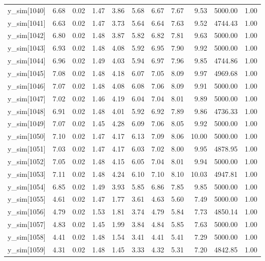 \begin{table}[ht]
\begin{tabular}{rrrrrrrrrrr}
  y\_sim[1040] & 6.68 & 0.02 & 1.47 & 3.86 & 5.68 & 6.67 & 7.67 & 9.53 & 5000.00 & 1.00 \\ 
  y\_sim[1041] & 6.63 & 0.02 & 1.47 & 3.73 & 5.64 & 6.64 & 7.63 & 9.52 & 4744.43 & 1.00 \\ 
  y\_sim[1042] & 6.80 & 0.02 & 1.48 & 3.87 & 5.82 & 6.82 & 7.81 & 9.63 & 5000.00 & 1.00 \\ 
  y\_sim[1043] & 6.93 & 0.02 & 1.48 & 4.08 & 5.92 & 6.95 & 7.90 & 9.92 & 5000.00 & 1.00 \\ 
  y\_sim[1044] & 6.96 & 0.02 & 1.49 & 4.03 & 5.94 & 6.97 & 7.96 & 9.85 & 4744.86 & 1.00 \\ 
  y\_sim[1045] & 7.08 & 0.02 & 1.48 & 4.18 & 6.07 & 7.05 & 8.09 & 9.97 & 4969.68 & 1.00 \\ 
  y\_sim[1046] & 7.07 & 0.02 & 1.48 & 4.08 & 6.08 & 7.06 & 8.09 & 9.91 & 5000.00 & 1.00 \\ 
  y\_sim[1047] & 7.02 & 0.02 & 1.46 & 4.19 & 6.04 & 7.04 & 8.01 & 9.89 & 5000.00 & 1.00 \\ 
  y\_sim[1048] & 6.91 & 0.02 & 1.48 & 4.01 & 5.92 & 6.92 & 7.89 & 9.86 & 4736.33 & 1.00 \\ 
  y\_sim[1049] & 7.07 & 0.02 & 1.45 & 4.28 & 6.09 & 7.06 & 8.05 & 9.92 & 5000.00 & 1.00 \\ 
  y\_sim[1050] & 7.10 & 0.02 & 1.47 & 4.17 & 6.13 & 7.09 & 8.06 & 10.00 & 5000.00 & 1.00 \\ 
  y\_sim[1051] & 7.03 & 0.02 & 1.47 & 4.17 & 6.03 & 7.02 & 8.00 & 9.95 & 4878.95 & 1.00 \\ 
  y\_sim[1052] & 7.05 & 0.02 & 1.48 & 4.15 & 6.05 & 7.04 & 8.01 & 9.94 & 5000.00 & 1.00 \\ 
  y\_sim[1053] & 7.11 & 0.02 & 1.48 & 4.24 & 6.10 & 7.10 & 8.10 & 10.03 & 4947.81 & 1.00 \\ 
  y\_sim[1054] & 6.85 & 0.02 & 1.49 & 3.93 & 5.85 & 6.86 & 7.85 & 9.85 & 5000.00 & 1.00 \\ 
  y\_sim[1055] & 4.61 & 0.02 & 1.47 & 1.77 & 3.61 & 4.63 & 5.60 & 7.49 & 5000.00 & 1.00 \\ 
  y\_sim[1056] & 4.79 & 0.02 & 1.53 & 1.81 & 3.74 & 4.79 & 5.84 & 7.73 & 4850.14 & 1.00 \\ 
  y\_sim[1057] & 4.83 & 0.02 & 1.45 & 1.99 & 3.84 & 4.84 & 5.85 & 7.63 & 5000.00 & 1.00 \\ 
  y\_sim[1058] & 4.41 & 0.02 & 1.48 & 1.54 & 3.41 & 4.41 & 5.41 & 7.29 & 5000.00 & 1.00 \\ 
  y\_sim[1059] & 4.31 & 0.02 & 1.48 & 1.45 & 3.33 & 4.32 & 5.31 & 7.20 & 4842.85 & 1.00 \\ 

\end{tabular}
\end{table}
